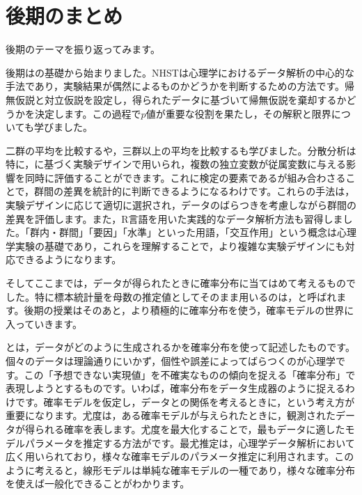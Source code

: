 \documentclass{ltjbook}
\begin{document}
\VerbatimFootnotes

\chapter{後期のまとめ}
\label{ch30_SecondSemester}

後期のテーマを振り返ってみます。

後期はの基礎から始まりました。NHSTは心理学におけるデータ解析の中心的な手法であり，実験結果が偶然によるものかどうかを判断するための方法です。帰無仮説と対立仮説を設定し，得られたデータに基づいて帰無仮説を棄却するかどうかを決定します。この過程で$p$値が重要な役割を果たし，その解釈と限界についても学びました。

二群の平均を比較するや，三群以上の平均を比較するも学びました。分散分析は特に，に基づく実験デザインで用いられ，複数の独立変数が従属変数に与える影響を同時に評価することができます。これに検定の要素であるが組み合わさることで，群間の差異を統計的に判断できるようになるわけです。これらの手法は，実験デザインに応じて適切に選択され，データのばらつきを考慮しながら群間の差異を評価します。また，R言語を用いた実践的なデータ解析方法も習得しました。「群内・群間」「要因」「水準」といった用語，「交互作用」という概念は心理学実験の基礎であり，これらを理解することで，より複雑な実験デザインにも対応できるようになります。

そしてここまでは，データが得られたときに確率分布に当てはめて考えるものでした。特に標本統計量を母数の推定値としてそのまま用いるのは，と呼ばれます。後期の授業はそのあと，より積極的に確率分布を使う，確率モデルの世界に入っていきます。

とは，データがどのように生成されるかを確率分布を使って記述したものです。個々のデータは理論通りにいかず，個性や誤差によってばらつくのが心理学です。この「予想できない実現値」を不確実なものの傾向を捉える「確率分布」で表現しようとするものです。いわば，確率分布をデータ生成器のように捉えるわけです。確率モデルを仮定し，データとの関係を考えるときに，という考え方が重要になります。尤度は，ある確率モデルが与えられたときに，観測されたデータが得られる確率を表します。尤度を最大化することで，最もデータに適したモデルパラメータを推定する方法がです。最尤推定は，心理学データ解析において広く用いられており，様々な確率モデルのパラメータ推定に利用されます。このように考えると，線形モデルは単純な確率モデルの一種であり，様々な確率分布を使えば一般化できることがわかります。
\end{document}
